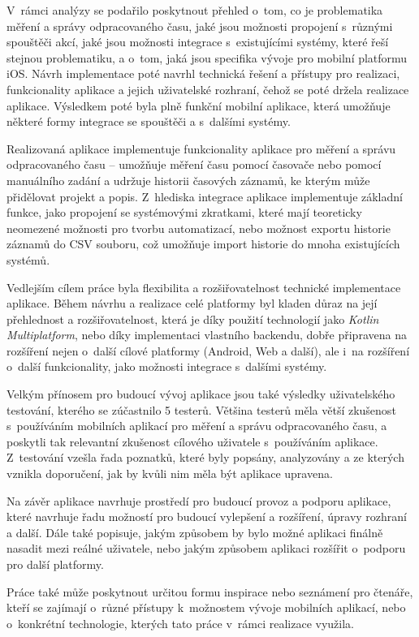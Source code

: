 V~rámci analýzy se podařilo poskytnout přehled o~tom, co je problematika měření a správy odpracovaného času, jaké jsou možnosti propojení s~různými spouštěči akcí, jaké jsou možnosti integrace s~existujícími systémy, které řeší stejnou problematiku, a o~tom, jaká jsou specifika vývoje pro mobilní platformu iOS. Návrh implementace poté navrhl technická řešení a přístupy pro realizaci, funkcionality aplikace a jejich uživatelské rozhraní, čehož se poté držela realizace aplikace. Výsledkem poté byla plně funkční mobilní aplikace, která umožňuje některé formy integrace se spouštěči a s~dalšími systémy.

Realizovaná aplikace implementuje funkcionality aplikace pro měření a správu odpracovaného času – umožňuje měření času pomocí časovače nebo pomocí manuálního zadání a udržuje historii časových záznamů, ke kterým může přidělovat projekt a popis. Z~hlediska integrace aplikace implementuje základní funkce, jako propojení se systémovými zkratkami, které mají teoreticky neomezené možnosti pro tvorbu automatizací, nebo možnost exportu historie záznamů do CSV souboru, což umožňuje import historie do mnoha existujících systémů.

Vedlejším cílem práce byla flexibilita a rozšiřovatelnost technické implementace aplikace. Během návrhu a realizace celé platformy byl kladen důraz na její přehlednost a rozšiřovatelnost, která je díky použití technologií jako \emph{Kotlin Multiplatform}, nebo díky implementaci vlastního backendu, dobře připravena na rozšíření nejen o~další cílové platformy (Android, Web a další), ale i~na rozšíření o~další funkcionality, jako možnosti integrace s~dalšími systémy.

Velkým přínosem pro budoucí vývoj aplikace jsou také výsledky uživatelského testování, kterého se zúčastnilo 5 testerů. Většina testerů měla větší zkušenost s~používáním mobilních aplikací pro měření a správu odpracovaného času, a poskytli tak relevantní zkušenost cílového uživatele s~používáním aplikace. Z~testování vzešla řada poznatků, které byly popsány, analyzovány a ze kterých vznikla doporučení, jak by kvůli nim měla být aplikace upravena.

Na závěr aplikace navrhuje prostředí pro budoucí provoz a podporu aplikace, které navrhuje řadu možností pro budoucí vylepšení a rozšíření, úpravy rozhraní a další. Dále také popisuje, jakým způsobem by bylo možné aplikaci finálně nasadit mezi reálné uživatele, nebo jakým způsobem aplikaci rozšířit o~podporu pro další platformy.

Práce také může poskytnout určitou formu inspirace nebo seznámení pro čtenáře, kteří se zajímají o~různé přístupy k~možnostem vývoje mobilních aplikací, nebo o~konkrétní technologie, kterých tato práce v~rámci realizace využila.



































